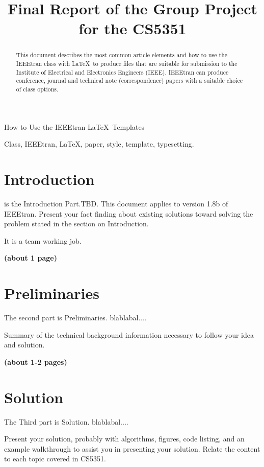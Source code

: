 \documentclass[lettersize,journal]{IEEEtran}
\begin{document}
\title{Final Report of the Group Project for the CS5351}




%
{How to Use the IEEEtran \LaTeX \ Templates}

\maketitle

\begin{abstract}
This document describes the most common article elements and how to use the IEEEtran class with \LaTeX \ to produce files that are suitable for submission to the Institute of Electrical and Electronics Engineers (IEEE).  IEEEtran can produce conference, journal and technical note (correspondence) papers with a suitable choice of class options.
\end{abstract}

\begin{IEEEkeywords}
Class, IEEEtran, \LaTeX, paper, style, template, typesetting.
\end{IEEEkeywords}


\section{Introduction}
 is the Introduction Part.TBD. This document applies to version 1.8b of IEEEtran. 
Present your fact finding about existing solutions toward solving the problem stated in the section on Introduction. 

It is a team working job. 

\textbf{(about 1 page)}

\section{Preliminaries }
\noindent The second part is Preliminaries.
blablabal....

Summary of the technical background information necessary to follow your idea and solution. 

\textbf{(about 1-2 pages)}

\section{Solution}
\noindent The Third part is Solution.
blablabal....

Present your solution, probably with algorithms, figures, code listing, and an example walkthrough to assist you in presenting your solution. Relate the content to each topic covered in CS5351.
\end{document}
